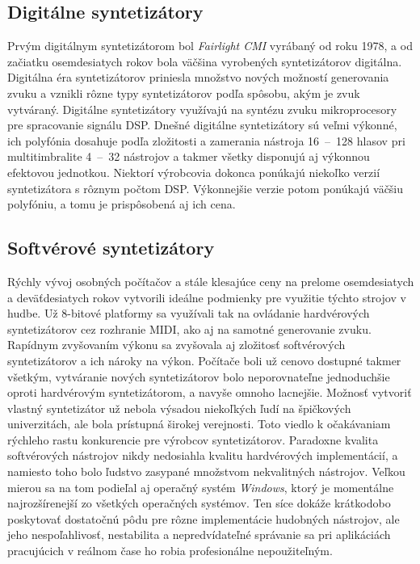 \subsection{Digitálne syntetizátory}

Prvým digitálnym syntetizátorom bol \emph{Fairlight CMI} vyrábaný od roku 1978, a od začiatku osemdesiatych rokov bola väčšina vyrobených syntetizátorov digitálna. Digitálna éra syntetizátorov priniesla množstvo nových možností generovania zvuku a vznikli rôzne typy syntetizátorov podľa spôsobu, akým je zvuk vytváraný. Digitálne syntetizátory využívajú na syntézu zvuku mikroprocesory pre spracovanie signálu DSP. Dnešné digitálne syntetizátory sú veľmi výkonné, ich polyfónia dosahuje podľa zložitosti a zamerania nástroja 16~--~128 hlasov pri multitimbralite 4~--~32 nástrojov a takmer všetky disponujú aj výkonnou efektovou jednotkou. Niektorí výrobcovia dokonca ponúkajú niekoľko verzií syntetizátora s rôznym počtom DSP. Výkonnejšie verzie potom ponúkajú väčšiu polyfóniu, a tomu je prispôsobená aj ich cena.

\subsection{Softvérové syntetizátory}

Rýchly vývoj osobných počítačov a stále klesajúce ceny na prelome osemdesiatych a deväťdesiatych rokov vytvorili ideálne podmienky pre využitie týchto strojov v hudbe. Už 8-bitové platformy sa využívali tak na ovládanie hardvérových syntetizátorov cez rozhranie MIDI, ako aj na samotné generovanie zvuku.
Rapídnym zvyšovaním výkonu sa zvyšovala aj zložitosť softvérových syntetizátorov a ich nároky na výkon.  Počítače boli už cenovo dostupné takmer všetkým, vytváranie nových syntetizátorov bolo neporovnateľne jednoduchšie oproti hardvérovým syntetizátorom, a navyše omnoho lacnejšie. Možnosť vytvoriť vlastný syntetizátor už nebola výsadou niekoľkých ľudí na špičkových univerzitách, ale bola prístupná širokej verejnosti. Toto viedlo k očakávaniam rýchleho rastu konkurencie pre výrobcov syntetizátorov. Paradoxne kvalita softvérových nástrojov nikdy nedosiahla kvalitu hardvérových implementácií, a namiesto toho bolo ľudstvo zasypané množstvom nekvalitných nástrojov. Veľkou mierou sa na tom podieľal aj operačný systém \emph{Windows}, ktorý je momentálne najrozšírenejší zo všetkých operačných systémov. Ten síce dokáže krátkodobo poskytovať dostatočnú pôdu pre rôzne implementácie hudobných nástrojov, ale jeho nespoľahlivosť, nestabilita a nepredvídateľné správanie sa pri aplikáciách pracujúcich v reálnom čase ho robia profesionálne nepoužiteľným.

